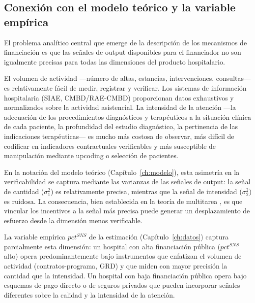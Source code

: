 \subsection{Conexión con el modelo teórico y la variable empírica}

El problema analítico central que emerge de la descripción de los mecanismos de financiación es que las señales de output disponibles para el financiador no son igualmente precisas para todas las dimensiones del producto hospitalario.

El volumen de actividad ---número de altas, estancias, intervenciones, consultas--- es relativamente fácil de medir, registrar y verificar. Los sistemas de información hospitalaria (SIAE, CMBD/RAE-CMBD) proporcionan datos exhaustivos y normalizados sobre la actividad asistencial. La intensidad de la atención ---la adecuación de los procedimientos diagnósticos y terapéuticos a la situación clínica de cada paciente, la profundidad del estudio diagnóstico, la pertinencia de las indicaciones terapéuticas--- es mucho más costosa de observar, más difícil de codificar en indicadores contractuales verificables y más susceptible de manipulación mediante upcoding o selección de pacientes.

En la notación del modelo teórico (Capítulo~\ref{ch:modelo}), esta asimetría en la verificabilidad se captura mediante las varianzas de las señales de output: la señal de cantidad ($\sigma_1^2$) es relativamente precisa, mientras que la señal de intensidad ($\sigma_2^2$) es ruidosa. La consecuencia, bien establecida en la teoría de multitarea \citep{holmstrom1991}, es que vincular los incentivos a la señal más precisa puede generar un desplazamiento de esfuerzo desde la dimensión menos verificable.

La variable empírica $pct^{SNS}$ de la estimación (Capítulo~\ref{ch:datos}) captura parcialmente esta dimensión: un hospital con alta financiación pública ($pct^{SNS}$ alto) opera predominantemente bajo instrumentos que enfatizan el volumen de actividad (contratos-programa, GRD) y que miden con mayor precisión la cantidad que la intensidad. Un hospital con baja financiación pública opera bajo esquemas de pago directo o de seguros privados que pueden incorporar señales diferentes sobre la calidad y la intensidad de la atención.



